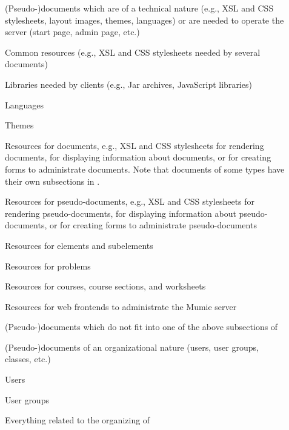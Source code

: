 \documentclass{generic}
\begin{document}
\begin{description}
\item[\label{sec_system}] (Pseudo-)documents which are of a
  technical nature (e.g., XSL and CSS stylesheets, layout images, themes,
  languages) or are needed to operate the server (start page, admin page, etc.)
\item[\label{sec_common}] Common resources (e.g., XSL and
  CSS stylesheets needed by several documents)
\item[\label{sec_libraries}] Libraries needed by clients
  (e.g., Jar archives, JavaScript libraries)
\item[\label{sec_languages}] Languages
\item[\label{sec_themes}] Themes
\item[\label{sec_document}] Resources for documents,
  e.g., XSL and CSS stylesheets for rendering documents, for displaying
  information about documents, or for creating forms to administrate documents.
  Note that documents of some types have their own subsections in .
\item[\label{sec_pseudodoc}] Resources for
  pseudo-documents, e.g., XSL and CSS stylesheets for rendering
  pseudo-documents, for displaying information about pseudo-documents, or for
  creating forms to administrate pseudo-documents
\item[\label{sec_element}] Resources for elements and
  subelements
\item[\label{sec_problem}] Resources for problems
\item[\label{sec_course}] Resources for courses, course
  sections, and worksheets
\item[\label{sec_admin}] Resources for web frontends to
  administrate the Mumie server
\item[\label{sec_misc}] (Pseudo-)documents which do not fit
  into one of the above subsections of 
\item[\label{sec_org}] (Pseudo-)documents of an organizational
  nature (users, user groups, classes, etc.)
\item[\label{sec_users}] Users
\item[\label{sec_users}] User groups
\item[\label{sec_uni}] Everything related to the organizing of

\end{description}
\end{document}
